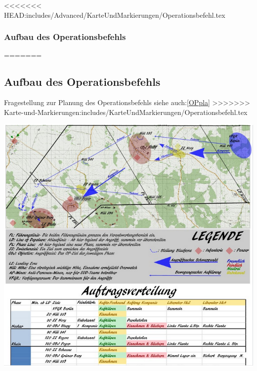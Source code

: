\newpage

<<<<<<< HEAD:includes/Advanced/KarteUndMarkierungen/Operationsbefehl.tex
\subsubsection{Aufbau des Operationsbefehls}
=======
\subsection{Aufbau des Operationsbefehls}
\label{OPbef}
Fragestellung zur Planung des Operationsbefehls siehe auch:\ref{OPpla}
>>>>>>> Karte-und-Markierungen:includes/KarteUndMarkierungen/Operationsbefehl.tex

\begin{minipage}[t]{1\textwidth}
	\includegraphics[width=\textwidth]{./Grafiken/KarteUndMarkierungen/OP-Befehl.png}
\end{minipage}

